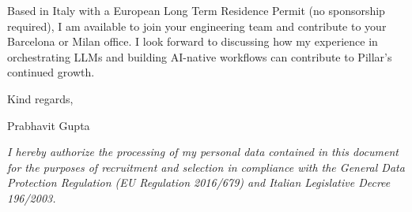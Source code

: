 \documentclass[10.5pt,a4paper]{article}
\begin{document}
Based in Italy with a European Long Term Residence Permit (no sponsorship required), I am available to join your engineering team and contribute to your Barcelona or Milan office. I look forward to discussing how my experience in orchestrating LLMs and building AI-native workflows can contribute to Pillar's continued growth.

Kind regards,

Prabhavit Gupta

\vspace{0.4em}
{\footnotesize \textit{I hereby authorize the processing of my personal data contained in this document for the purposes of recruitment and selection in compliance with the General Data Protection Regulation (EU Regulation 2016/679) and Italian Legislative Decree 196/2003.}\par}
\end{document}
